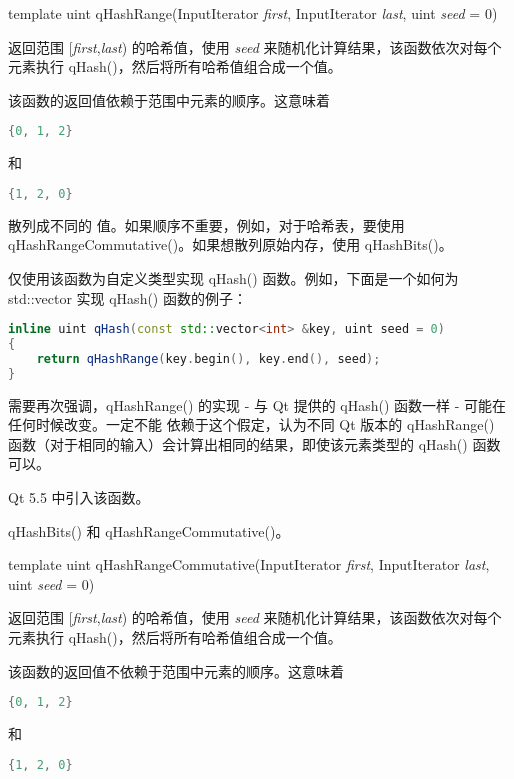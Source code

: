 template uint qHashRange(InputIterator \emph{first}, InputIterator \emph{last}, uint \emph{seed} = 0)

返回范围 [\emph{first},\emph{last}) 的哈希值，使用 \emph{seed} 来随机化计算结果，该函数依次对每个元素执行 qHash()，然后将所有哈希值组合成一个值。

该函数的返回值依赖于范围中元素的顺序。这意味着

\begin{lstlisting}[language=C++]
{0, 1, 2}
\end{lstlisting}

和

\begin{lstlisting}[language=C++]
{1, 2, 0}
\end{lstlisting}

散列成不同的 值。如果顺序不重要，例如，对于哈希表，要使用 qHashRangeCommutative()。如果想散列原始内存，使用 qHashBits()。

仅使用该函数为自定义类型实现 qHash() 函数。例如，下面是一个如何为
std::vector 实现 qHash() 函数的例子：

\begin{lstlisting}[language=C++]
inline uint qHash(const std::vector<int> &key, uint seed = 0)
{
    return qHashRange(key.begin(), key.end(), seed);
}
\end{lstlisting}

需要再次强调，qHashRange() 的实现 - 与 Qt 提供的 qHash() 函数一样 - 可能在任何时候改变。一定不能 依赖于这个假定，认为不同 Qt 版本的 qHashRange() 函数（对于相同的输入）会计算出相同的结果，即使该元素类型的 qHash() 函数可以。

Qt 5.5 中引入该函数。

\begin{seeAlso}
qHashBits() 和 qHashRangeCommutative()。
\end{seeAlso}


template uint qHashRangeCommutative(InputIterator \emph{first}, InputIterator \emph{last}, uint \emph{seed} = 0)

返回范围 [\emph{first},\emph{last}) 的哈希值，使用 \emph{seed} 来随机化计算结果，该函数依次对每个元素执行 qHash()，然后将所有哈希值组合成一个值。

该函数的返回值不依赖于范围中元素的顺序。这意味着

\begin{lstlisting}[language=C++]
{0, 1, 2}
\end{lstlisting}

和

\begin{lstlisting}[language=C++]
{1, 2, 0}
\end{lstlisting}

